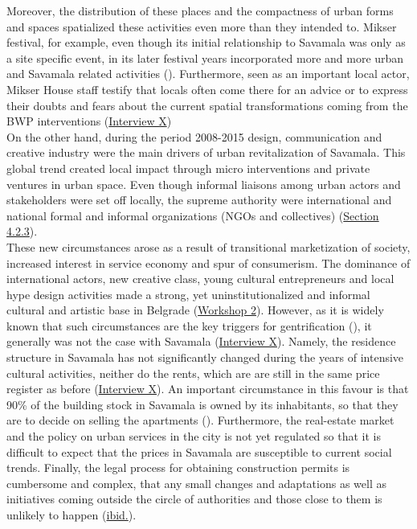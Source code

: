 \documentclass[11pt]{report}
\begin{document}
Moreover, the distribution of these places and the compactness of urban forms and spaces spatialized these activities even more than they intended to.
Mikser festival, for example, even though its initial relationship to Savamala was only as a site specific event, in its later festival years incorporated more and more urban and Savamala related activities
(\cite{(check ref  web The Game of Savamala and XXXX, Mikser Festival 2014)}).
Furthermore, seen as an important local actor, Mikser House staff testify that locals often come there for an advice or to express their doubts and fears about the current spatial transformations coming from the BWP interventions 
(\href{InterviewX}{Interview X})
\\

On the other hand, during the period 2008-2015 design, communication and creative industry were the main drivers of urban revitalization of Savamala.
This global trend created local impact through micro interventions and private ventures in urban space.
Even though informal liaisons among urban actors and stakeholders were set off locally, the supreme  authority were international and national formal and informal organizations (NGOs and collectives) (\href{Section 4.2.3}{Section 4.2.3}). %
\\

These new circumstances arose as a result of transitional marketization of society, increased interest in service economy and spur of consumerism.
The dominance of international actors, new creative class, young cultural entrepreneurs and local hype design activities made a strong, yet uninstitutionalized and informal cultural and artistic base in Belgrade (\href{PHD Workshop}{Workshop 2}).
However, as it is widely known that such circumstances are the key triggers for gentrification (\cite{Klaus2015a}),
it generally was not the case with Savamala (\href{InterviewX}{Interview X}).
Namely, the residence structure in Savamala has not significantly changed during the years of intensive cultural activities, neither do the rents, which are are still in the same price register as before (\href{InterviewX}{Interview X}).
An important circumstance in this favour is that 90\% of the building stock in Savamala is owned by its inhabitants, so that they are to decide on selling the apartments (\cite{Klaus2015b}).
Furthermore, the real-estate market and the policy on urban services in the city is not yet regulated so that it is difficult to expect that the prices in Savamala are susceptible to current social trends.
Finally, the legal process for obtaining construction permits is cumbersome and complex, that any small changes and adaptations as well as initiatives coming outside the circle of authorities and those close to them is unlikely to happen (\href{Klaus}{ibid.}).
\\
\end{document}
